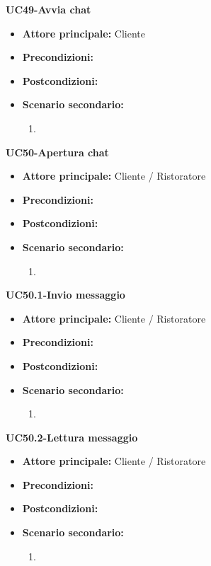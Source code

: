
\textbf{UC49-Avvia chat}
\begin{itemize}
\item \textbf{Attore principale:} Cliente
\item \textbf{Precondizioni:}
\item \textbf{Postcondizioni:}
\item \textbf{Scenario secondario:}
\begin{enumerate}
    \item
\end{enumerate}
\end{itemize}

\textbf{UC50-Apertura chat}
\begin{itemize}
\item \textbf{Attore principale:} Cliente / Ristoratore
\item \textbf{Precondizioni:}
\item \textbf{Postcondizioni:}
\item \textbf{Scenario secondario:}
\begin{enumerate}
    \item
\end{enumerate}
\end{itemize}

\textbf{UC50.1-Invio messaggio}
\begin{itemize}
\item \textbf{Attore principale:} Cliente / Ristoratore
\item \textbf{Precondizioni:}
\item \textbf{Postcondizioni:}
\item \textbf{Scenario secondario:}
\begin{enumerate}
    \item
\end{enumerate}
\end{itemize}

\textbf{UC50.2-Lettura messaggio}
\begin{itemize}
\item \textbf{Attore principale:} Cliente / Ristoratore
\item \textbf{Precondizioni:}
\item \textbf{Postcondizioni:}
\item \textbf{Scenario secondario:}
\begin{enumerate}
    \item
\end{enumerate}
\end{itemize}
